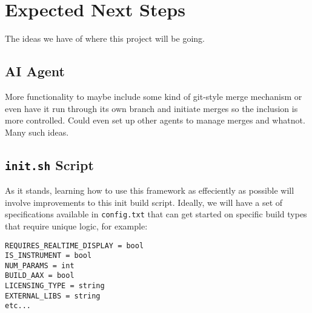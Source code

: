 \documentclass[twocolumn,natbib]{svjour3}        %
\begin{document}
\section{Expected Next Steps}
The ideas we have of where this project will be going.
\subsection{AI Agent}
More functionality to maybe include some kind of git-style merge mechanism or even have it run through its own branch and initiate merges so the inclusion is more controlled. Could even set up other agents to manage merges and whatnot. Many such ideas.
\subsection{\texttt{init.sh} Script}
As it stands, learning how to use this framework as effeciently as possible will involve improvements to this init build script. Ideally, we will have a set of specifications available in \texttt{config.txt} that can get started on specific build types that require unique logic, for example:
\begin{verbatim}
REQUIRES_REALTIME_DISPLAY = bool
IS_INSTRUMENT = bool
NUM_PARAMS = int
BUILD_AAX = bool
LICENSING_TYPE = string
EXTERNAL_LIBS = string
etc...
\end{verbatim}




\phantom{.}

\end{document}
